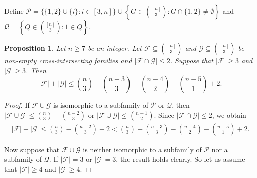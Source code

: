 \documentclass[11pt]{article}
\numberwithin{equation}{section}
\newtheorem{prop}[theorem]{Proposition}
\begin{document}
Define $
\mathcal{P}=\{\{1,2\} \cup\{i\}: i \in[3, n]\}\cup\left\{G \in\binom{[n]}{3}:  G\cap \{1,2\}\neq \emptyset\right\}$ and $
\mathcal{Q}=\left\{Q \in\binom{[n]}{3}: 1\in Q\right\}$.

\begin{prop}\label{pr5}
Let $n \geq 7$ be an integer. Let $\mathcal{F} \subseteq\binom{[n]}{3}$ and $\mathcal{G} \subseteq\binom{[n]}{3}$ be  non-empty cross-intersecting families and $|\mathcal{F} \cap \mathcal{G}|\leq 2$. Suppose that $|\mathcal{F}| \geq 3$ and $|\mathcal{G}| \geq 3$. Then
$$
|\mathcal{F}|+|\mathcal{G}| \leq\binom{n}{3}-\binom{n-3}{3}-\binom{n-4}{2}-\binom{n-5}{1}+2.
$$
\end{prop}
\begin{proof}
If $\mathcal{F}\cup \mathcal{G}$ is isomorphic to a subfamily of $\mathcal{P}$ or $\mathcal{Q}$, then $|\mathcal{F}\cup \mathcal{G}|\leq \binom{n}{3}-\binom{n-2}{3}$ or $|\mathcal{F}\cup \mathcal{G}|\leq \binom{n-1}{2}$. Since $|\mathcal{F} \cap \mathcal{G}|\leq 2$, we obtain
\begin{align*}
|\mathcal{F}|+|\mathcal{G}|\leq \binom{n}{3}-\binom{n-2}{3}+2<\binom{n}{3}-\binom{n-3}{3}-\binom{n-4}{2}-\binom{n-5}{1}+2.
\end{align*}


Now suppose that $\mathcal{F}\cup \mathcal{G}$ is neither isomorphic to a subfamily of $\mathcal{P}$ nor a subfamily of $\mathcal{Q}$. If $|\mathcal{F}| = 3$ or $|\mathcal{G}| = 3$, the result holds clearly. So let us assume that $|\mathcal{F}| \geq 4$ and $|\mathcal{G}| \geq 4$.


\end{proof}
\end{document}
